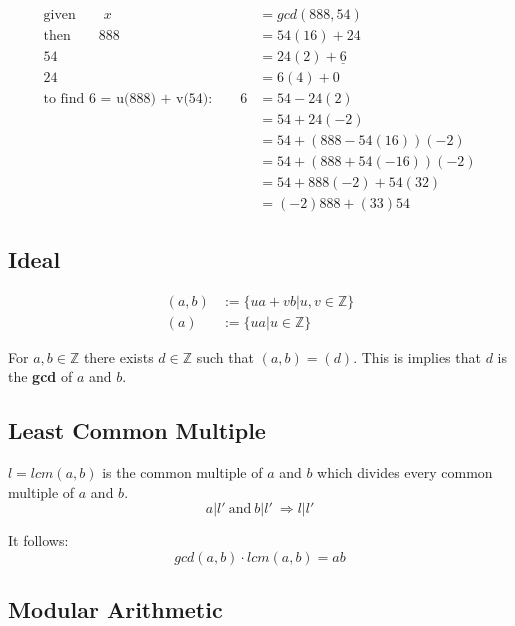 \documentclass[11pt]{article}
\begin{document}
\begin{equation*}
\begin{split}
	\text{given}\qquad x & = gcd(888, 54) \\
	\text{then}\qquad 888 & = 54(16) + 24 \\
	54 & = 24(2) + \underline{6} \\
	24 & = 6(4) + 0 \\
	\text{to find 6 = u(888) + v(54):}\qquad 6 & = 54 - 24(2) \\
	& = 54 + 24(-2) \\
	& = 54+ (888-54(16))(-2) \\
	& = 54 + (888+54(-16))(-2) \\
	& = 54 + 888(-2) + 54(32) \\
	& = (-2)888 + (33)54
\end{split}
\end{equation*}

\subsection{Ideal}

\begin{equation*}
\begin{split}
	(a,b) & := \{ua + vb | u,v \in \mathbb{Z}\} \\
	(a) & := \{ua | u \in \mathbb{Z}\}
\end{split}
\end{equation*}

For $a,b \in \mathbb{Z}$ there exists $d \in \mathbb{Z}$ such that $(a,b) = (d)$. This is implies that $d$ is the \textbf{gcd} of $a$ and $b$.

\subsection{Least Common Multiple}

$l = lcm(a,b)$ is the common multiple of $a$ and $b$ which divides every common multiple of $a$ and $b$.
\begin{equation*}
	a|l'\ \text{and}\ b|l'\ \Rightarrow l|l'
\end{equation*}

It follows:
\begin{equation*}
	gcd(a,b) \cdot lcm(a,b) = ab
\end{equation*}

\subsection{Modular Arithmetic}
\end{document}
